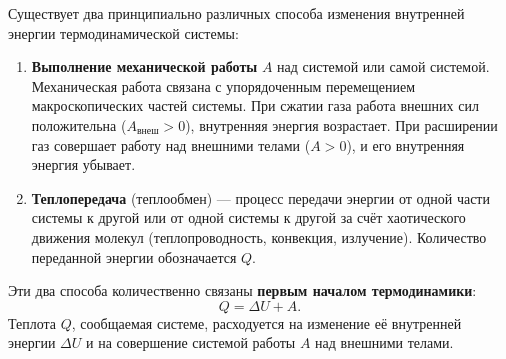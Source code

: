 \begin{property}
Существует два принципиально различных способа изменения внутренней энергии термодинамической системы:
\begin{enumerate}
    \item \textbf{Выполнение механической работы} $A$ над системой или самой системой. Механическая работа связана с упорядоченным перемещением макроскопических частей системы. При сжатии газа работа внешних сил положительна ($A_{\text{внеш}} > 0$), внутренняя энергия возрастает. При расширении газ совершает работу над внешними телами ($A > 0$), и его внутренняя энергия убывает.
    \item \textbf{Теплопередача} (теплообмен) --- процесс передачи энергии от одной части системы к другой или от одной системы к другой за счёт хаотического движения молекул (теплопроводность, конвекция, излучение). Количество переданной энергии обозначается $Q$.
\end{enumerate}
Эти два способа количественно связаны \textbf{первым началом термодинамики}:
\begin{equation}
    Q = \Delta U + A. \label{eq:first_law_42}
\end{equation}
Теплота $Q$, сообщаемая системе, расходуется на изменение её внутренней энергии $\Delta U$ и на совершение системой работы $A$ над внешними телами.
\end{property}
